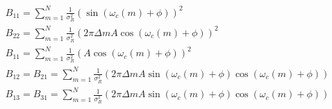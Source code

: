 \begin{center}
\begin{eqnarray}
	B_{11} = \sum \limits_{m=1}^N \frac{1}{\sigma_R^2}(\sin(\omega_c(m)+\phi))^2 \\
	B_{22} = \sum \limits_{m=1}^N \frac{1}{\sigma_R^2}(2\pi \Delta m A \cos(\omega_c(m)+\phi))^2 \\
	B_{11} = \sum \limits_{m=1}^N \frac{1}{\sigma_R^2}(A\cos(\omega_c(m)+\phi))^2 \\
	B_{12} =  B_{21} = \sum \limits_{m=1}^N \frac{1}{\sigma_R^2}(2\pi \Delta m A\sin(\omega_c(m)+\phi)\cos(\omega_c(m)+\phi)) \\
	B_{13} =  B_{31} = \sum \limits_{m=1}^N \frac{1}{\sigma_R^2}(2\pi \Delta m A\sin(\omega_c(m)+\phi)\cos(\omega_c(m)+\phi)) \\
\end{eqnarray}
\end{center}
